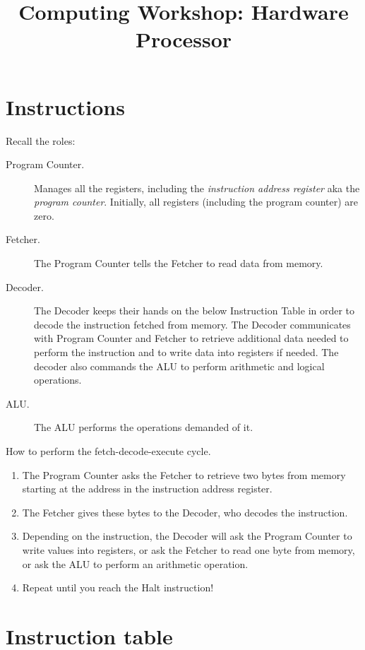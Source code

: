 \documentclass[11pt]{article}
\title{Computing Workshop: Hardware\\Processor}
\begin{document}
\maketitle

\section*{Instructions}

Recall the roles:
\begin{description}
\item[Program Counter.]
  Manages all the registers, including the \emph{instruction address register}
  aka the \emph{program counter}.
  Initially, all registers (including the program counter) are zero.
\item[Fetcher.]
  The Program Counter tells the Fetcher to read data from memory.
\item[Decoder.]
  The Decoder keeps their hands on the below Instruction Table in order to
  decode the instruction fetched from memory.
  The Decoder communicates with Program Counter and Fetcher to retrieve
  additional data needed to perform the instruction and to write data into
  registers if needed.
  The decoder also commands the ALU to perform arithmetic and logical operations.
\item[ALU.]
  The ALU performs the operations demanded of it.
\end{description}

How to perform the fetch-decode-execute cycle.
\begin{enumerate}
\item
  The Program Counter asks the Fetcher to retrieve two bytes from memory
  starting at the address in the instruction address register.
\item
  The Fetcher gives these bytes to the Decoder, who decodes the instruction.
\item
  Depending on the instruction, the Decoder will ask the Program Counter to
  write values into registers, or ask the Fetcher to read one byte from memory,
  or ask the ALU to perform an arithmetic operation.
\item
  Repeat until you reach the Halt instruction!
\end{enumerate}

\newpage

\section*{Instruction table}
\end{document}
